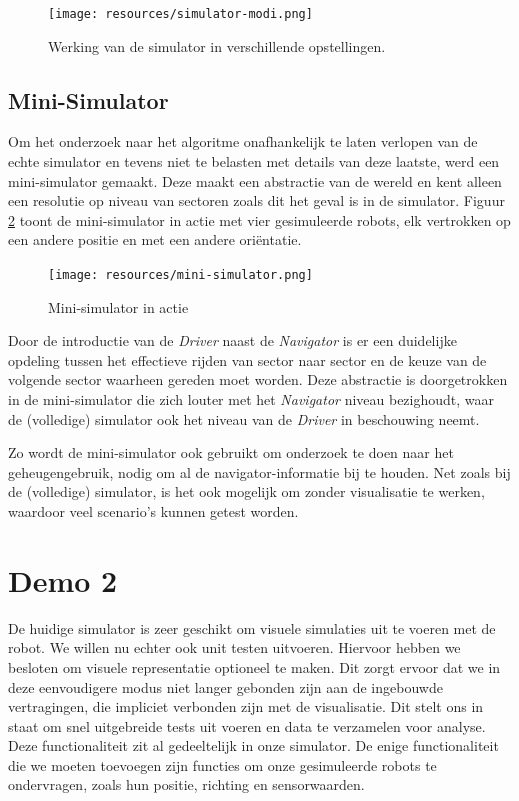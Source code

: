 \documentclass[12pt,a4paper]{report}
\begin{document}
\begin{figure}[htbp]
  \centering
  \texttt{[image: resources/simulator-modi.png]}
  \caption{Werking van de simulator in verschillende opstellingen.}
  \label{fig:simulator-modi}
\end{figure}

\subsection{Mini-Simulator}
\label{sect:mini-simulator}
Om het onderzoek naar het algoritme onafhankelijk te laten verlopen van de echte simulator en tevens niet te belasten met details van deze laatste, werd een mini-simulator gemaakt. Deze maakt een abstractie van de wereld en kent alleen een resolutie op niveau van sectoren zoals dit het geval is in de simulator. Figuur \ref{fig:mini-simulator} toont de mini-simulator in actie met vier gesimuleerde robots, elk vertrokken op een andere positie en met een andere ori\"entatie.

\begin{figure}[htbp]
  \centering
  \texttt{[image: resources/mini-simulator.png]}
  \caption{Mini-simulator in actie}
  \label{fig:mini-simulator}
\end{figure}

Door de introductie van de \emph{Driver} naast de \emph{Navigator} is er een duidelijke opdeling tussen het effectieve rijden van sector naar sector en de keuze van de volgende sector waarheen gereden moet worden. Deze abstractie is doorgetrokken in de mini-simulator die zich louter met het \emph{Navigator} niveau bezighoudt, waar de (volledige) simulator ook het niveau van de \emph{Driver} in beschouwing neemt.

Zo wordt de mini-simulator ook gebruikt om onderzoek te doen naar het geheugengebruik, nodig om al de navigator-informatie bij te houden. Net zoals bij de (volledige) simulator, is het ook mogelijk om zonder visualisatie te werken, waardoor veel scenario's kunnen getest worden.

\section{Demo 2}

De huidige simulator is zeer geschikt om visuele simulaties uit te voeren met de robot. We willen nu echter ook unit testen uitvoeren. Hiervoor hebben we besloten om visuele representatie optioneel te maken. Dit zorgt ervoor dat we in deze eenvoudigere modus niet langer gebonden zijn aan de ingebouwde vertragingen, die impliciet verbonden zijn met de visualisatie.
Dit stelt ons in staat om snel uitgebreide tests uit voeren en data te verzamelen voor analyse.
Deze functionaliteit zit al gedeeltelijk in onze simulator. De enige functionaliteit die we moeten toevoegen zijn functies om onze gesimuleerde robots te ondervragen, zoals hun positie, richting en sensorwaarden.
\end{document}
